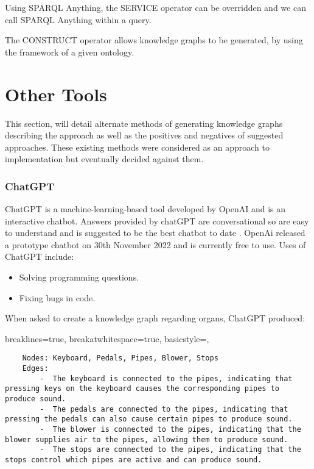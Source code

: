 Using SPARQL Anything, the SERVICE operator can be overridden and we can call SPARQL Anything within a query. \cite{sparqlanything}

The CONSTRUCT operator allows knowledge graphs to be generated, by using the framework of a given ontology. \cite{sparqlanythinggithub}

\section{Other Tools}

\hspace{0.5cm} This section, will detail alternate methods of generating knowledge graphs describing the approach as well as the positives and negatives of suggested approaches. These existing methods were considered as an approach to implementation but eventually decided against them. 

\subsubsection{ChatGPT}
\hspace{0.5cm}  ChatGPT is a machine-learning-based tool developed by OpenAI and is an interactive chatbot. Answers provided by chatGPT are conversational so are easy to understand and is suggested to be the best chatbot to date \cite{chatgpt}. OpenAi released a prototype chatbot on 30th November 2022 and is currently free to use. Uses of ChatGPT include:

\vspace{-0.15cm}
\begin{itemize}
    \itemsep0em 
\item Solving programming questions.
\vspace{-0.1cm}
\item Fixing bugs in code.
\end{itemize}
\vspace{-0.15cm}

\noindent When asked to create a knowledge graph regarding organs, ChatGPT produced:

\lstset
{
    breaklines=true,
    breakatwhitespace=true,
    basicstyle=\linespread{1.5}\ttfamily,
}
\begin{lstlisting}
    Nodes: Keyboard, Pedals, Pipes, Blower, Stops
    Edges:
        -  The keyboard is connected to the pipes, indicating that pressing keys on the keyboard causes the corresponding pipes to produce sound.
        -  The pedals are connected to the pipes, indicating that pressing the pedals can also cause certain pipes to produce sound.
        -  The blower is connected to the pipes, indicating that the blower supplies air to the pipes, allowing them to produce sound.
        -  The stops are connected to the pipes, indicating that the stops control which pipes are active and can produce sound.
\end{lstlisting}

